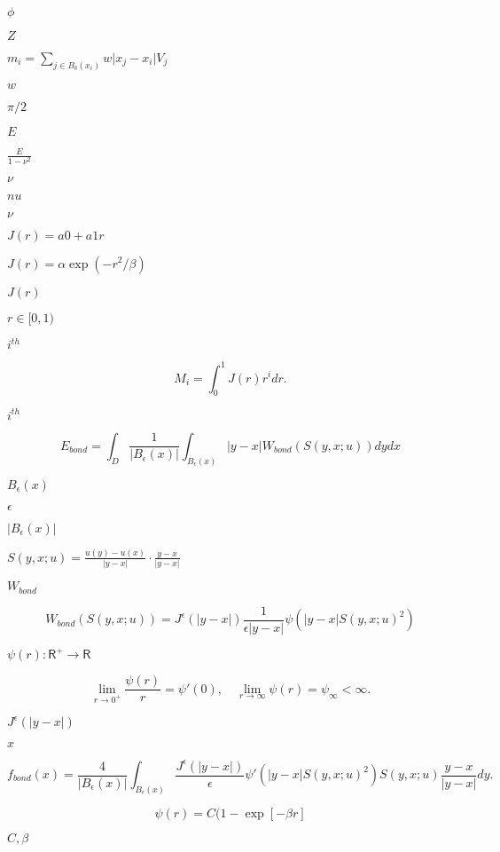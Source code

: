 \documentclass{article}
\begin{document}
$ \phi $
\pagebreak

$ Z $
\pagebreak

$m_i = \sum\limits_{j\in B_\delta(x_i)} w \vert x_j - x_i \vert V_j$
\pagebreak

$w$
\pagebreak

$ \pi/2 $
\pagebreak

$ E$
\pagebreak

$ \frac{E}{1 - \nu^2} $
\pagebreak

$ \nu$
\pagebreak

$ nu$
\pagebreak

$ \nu $
\pagebreak

$ J(r) = a0 + a1 r $
\pagebreak

$ J(r) = \alpha \exp(-r^2/\beta) $
\pagebreak

$ J(r) $
\pagebreak

$ r\in [0,1)$
\pagebreak

$ i^{th} $
\pagebreak

\[ M_i = \int_0^1 J(r) r^i dr. \]
\pagebreak

$ i^{th}$
\pagebreak

\[ E_{bond} = \int_D \frac{1}{|B_\epsilon(x)|} \int_{B_\epsilon(x)} |y-x| W_{bond}(S(y,x; u)) dy dx \]
\pagebreak

$ B_\epsilon(x) $
\pagebreak

$ \epsilon$
\pagebreak

$ |B_\epsilon(x)| $
\pagebreak

$ S(y,x;u) = \frac{u(y) - u(x)}{|y-x|} \cdot \frac{y-x}{|y-x|} $
\pagebreak

$ W_{bond} $
\pagebreak

\[ W_{bond} (S(y,x;u)) = J^\epsilon(|y-x|) \frac{1}{\epsilon |y-x|} \psi (|y-x| S(y,x;u)^2) \]
\pagebreak

$ \psi(r) : \textsf{R}^+ \to \textsf{R} $
\pagebreak

\[ \lim_{r\to 0^+} \frac{\psi(r)}{r} = \psi'(0), \quad \lim_{r\to \infty} \psi(r) = \psi_\infty < \infty. \]
\pagebreak

$ J^\epsilon(|y-x|)$
\pagebreak

$ x $
\pagebreak

\[ f_{bond}(x) = \frac{4}{|B_\epsilon(x)|} \int_{B_\epsilon(x)} \frac{J^\epsilon(|y-x|)}{\epsilon} \psi'(|y-x| S(y,x;u)^2) S(y,x;u) \frac{y-x}{|y-x|} dy.\]
\pagebreak

\[ \psi(r) = C ( 1-\exp[-\beta r] \]
\pagebreak

$ C, \beta $
\pagebreak
\end{document}
